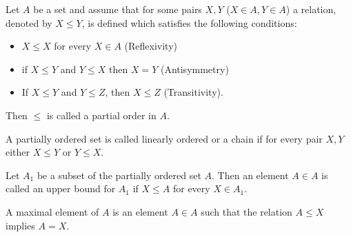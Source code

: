 Let $A$ be a set and assume that for some pairs $X, Y$ ($X \in A, Y \in A$) a relation, denoted by $X \leq Y$, is defined which satisfies the following conditions:

\begin{itemize}
\item[(i)] $X \leq X$ for every $X \in A$ (Reflexivity)
\item[(ii)] if $X \leq Y$ and $Y \leq X$ then $X = Y$ (Antisymmetry)
\item[(iii)] If $X \leq Y$ and $Y \leq Z$, then $X \leq Z$ (Transitivity).
\end{itemize}

Then $\leq$ is called a partial order in $A$.

A partially ordered set is called linearly ordered or a chain if for every pair $X, Y$ either $X \leq Y$ or $Y \leq X$.

Let $A_1$ be a subset of the partially ordered set $A$. Then an element $A \in A$ is called an upper bound for $A_1$ if $X \leq A$ for every $X \in A_1$.

A maximal element of $A$ is an element $A \in A$ such that the relation $A \leq X$ implies $A = X$.
